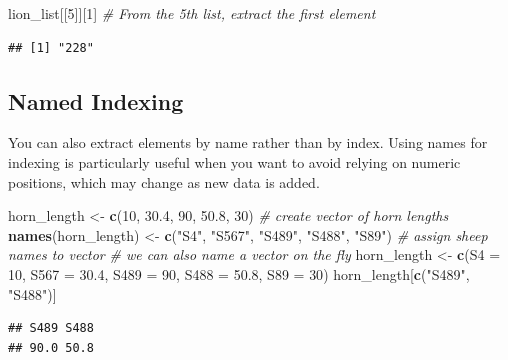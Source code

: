 \documentclass[
]{book}
\newenvironment{Shaded}{\begin{snugshade}}{\end{snugshade}}
\newcommand{\AttributeTok}[1]{\textcolor[rgb]{0.13,0.29,0.53}{#1}}
\newcommand{\CommentTok}[1]{\textcolor[rgb]{0.56,0.35,0.01}{\textit{#1}}}
\newcommand{\DecValTok}[1]{\textcolor[rgb]{0.00,0.00,0.81}{#1}}
\newcommand{\FloatTok}[1]{\textcolor[rgb]{0.00,0.00,0.81}{#1}}
\newcommand{\FunctionTok}[1]{\textcolor[rgb]{0.13,0.29,0.53}{\textbf{#1}}}
\newcommand{\NormalTok}[1]{#1}
\newcommand{\OtherTok}[1]{\textcolor[rgb]{0.56,0.35,0.01}{#1}}
\newcommand{\StringTok}[1]{\textcolor[rgb]{0.31,0.60,0.02}{#1}}
\begin{document}
\begin{Shaded}
\begin{Highlighting}[]
\NormalTok{lion\_list[[}\DecValTok{5}\NormalTok{]][}\DecValTok{1}\NormalTok{] }\CommentTok{\# From the 5th list, extract the first element}
\end{Highlighting}
\end{Shaded}

\begin{verbatim}
## [1] "228"
\end{verbatim}

\subsection{Named Indexing}\label{named-indexing}

You can also extract elements by name rather than by index. Using names for indexing is particularly useful when you want to avoid relying on numeric positions, which may change as new data is added.

\begin{Shaded}
\begin{Highlighting}[]
\NormalTok{horn\_length }\OtherTok{\textless{}{-}} \FunctionTok{c}\NormalTok{(}\DecValTok{10}\NormalTok{, }\FloatTok{30.4}\NormalTok{, }\DecValTok{90}\NormalTok{, }\FloatTok{50.8}\NormalTok{, }\DecValTok{30}\NormalTok{) }\CommentTok{\# create vector of horn lengths}
\FunctionTok{names}\NormalTok{(horn\_length) }\OtherTok{\textless{}{-}} \FunctionTok{c}\NormalTok{(}\StringTok{"S4"}\NormalTok{, }\StringTok{"S567"}\NormalTok{, }\StringTok{"S489"}\NormalTok{, }\StringTok{"S488"}\NormalTok{, }\StringTok{"S89"}\NormalTok{) }\CommentTok{\# assign sheep names to vector}
\CommentTok{\# we can also name a vector \textquotesingle{}on the fly\textquotesingle{}}
\NormalTok{horn\_length }\OtherTok{\textless{}{-}} \FunctionTok{c}\NormalTok{(}\AttributeTok{S4 =} \DecValTok{10}\NormalTok{, }\AttributeTok{S567 =} \FloatTok{30.4}\NormalTok{, }\AttributeTok{S489 =} \DecValTok{90}\NormalTok{, }\AttributeTok{S488 =} \FloatTok{50.8}\NormalTok{, }\AttributeTok{S89 =} \DecValTok{30}\NormalTok{) }
\NormalTok{horn\_length[}\FunctionTok{c}\NormalTok{(}\StringTok{"S489"}\NormalTok{, }\StringTok{"S488"}\NormalTok{)]}
\end{Highlighting}
\end{Shaded}

\begin{verbatim}
## S489 S488 
## 90.0 50.8
\end{verbatim}
\end{document}

